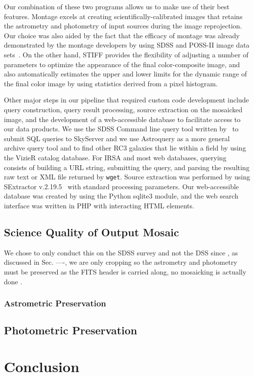 \documentclass[authoryear, 12pt, 5p, times]{elsarticle}
\begin{document}
Our combination of these two programs allows us to make use of their best features. Montage excels at creating scientifically-calibrated images that retains the astrometry and photometry of input sources during the image reprojection. Our choice was also aided by the fact that the efficacy of montage was already demonstrated by the montage developers by using SDSS and POSS-II image data sets~\citep{montage}. On the other hand, STIFF provides the flexibility of adjusting a number of parameters to optimize the appearance of the final color-composite image, and also automatically estimates the upper and lower limits for the dynamic range of the final color image by using statistics derived from a pixel histogram. 

Other major steps in our pipeline that required custom code development include query construction, query result processing, source extraction on the mosaicked image, and the development of a web-accessible database to facilitate access to our data products. We use the SDSS Command line query tool written by~\cite{sqlclref}  to submit SQL queries to SkyServer and we use Astroquery as a more general archive query tool and to find other RC3 galaxies that lie within a field by using the VizieR catalog database. For IRSA and most web databases, querying consists of building a URL string, submitting the query, and parsing the resulting  raw text or XML file returned by \texttt{wget}. Source extraction was performed by using SExtractor v.2.19.5~\citep{sextractor} with standard processing parameters. Our web-accessible database was created by using the Python sqlite3 module, and the web search interface was written in PHP with interacting HTML elements.
\subsection{Science Quality of Output Mosaic}
We chose to only conduct this on the SDSS survey and not the DSS since 
, as discussed in Sec. ----, we are only cropping so the astrometry and photometry must be preserved as the FITS header is carried along,  no mosaicking is actually done . 
\subsubsection{Astrometric Preservation}
\subsection{Photometric Preservation}
 \section{Conclusion\label{conc-sec}}
 
\end{document}

